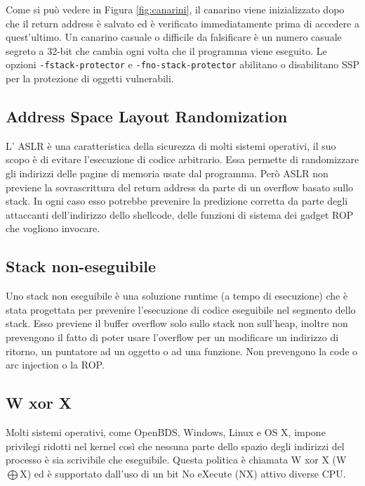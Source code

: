 Come si può vedere in Figura \ref{fig:canarini}, il canarino viene inizializzato dopo
che il return address è salvato ed è verificato
immediatamente prima di accedere a quest'ultimo. Un canarino casuale o difficile da
falsificare è un numero casuale segreto a 32-bit che cambia ogni
volta che il programma viene eseguito. Le opzioni \verb|-fstack-protector|
e \verb|-fno-stack-protector| abilitano o disabilitano SSP per la protezione di
oggetti vulnerabili.

\subsection{Address Space Layout Randomization}

L' ASLR è una caratteristica della sicurezza di molti sistemi operativi, il suo scopo
è di evitare l'esecuzione di codice arbitrario. Essa permette di randomizzare gli
indirizzi delle pagine di memoria usate dal programma. Però ASLR non previene la
sovrascrittura del return address da parte di un overflow basato sullo stack. In ogni
caso esso potrebbe prevenire la predizione corretta da parte degli attaccanti
dell'indirizzo dello shellcode, delle funzioni di sistema dei gadget ROP che
vogliono invocare.

\subsection{Stack non-eseguibile}

Uno stack non eseguibile è una soluzione runtime (a tempo di esecuzione) che è stata
progettata per prevenire l'esecuzione di codice eseguibile  nel segmento dello stack.
Esso previene il buffer overflow solo sullo stack non sull'heap, inoltre non prevengono
il fatto di poter usare l'overflow per un modificare un indirizzo di ritorno, un
puntatore ad un oggetto o ad una funzione. Non prevengono la code o arc injection
o la ROP.

\subsection{W xor X}

Molti sistemi operativi, come OpenBDS, Windows, Linux e OS X, impone privilegi ridotti
nel kernel così
che nessuna parte dello spazio degli indirizzi del processo è sia scrivibile che
eseguibile.
Questa politica è chiamata W xor X (W$\bigoplus$X) ed è supportato dall'uso di un
bit No eXecute (NX) attivo diverse CPU.